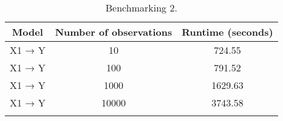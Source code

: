 \documentclass[
  11pt,
  article]{jss}
\begin{document}
\begin{longtable}{ccc}

\toprule
Model & Number of observations & Runtime (seconds)\\
\midrule
X1 → Y & 10 & 724.55\\
X1 → Y & 100 & 791.52\\
X1 → Y & 1000 & 1629.63\\
X1 → Y & 10000 & 3743.58\\
\bottomrule


\caption{\label{tbl-bench2}Benchmarking 2.}

\tabularnewline
\end{longtable}

\newpage{}
\end{document}
